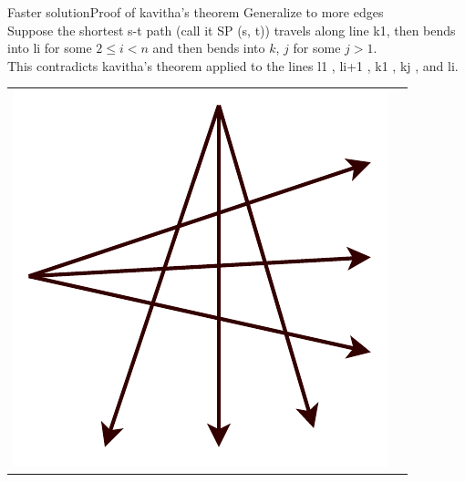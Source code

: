 \documentclass{beamer}
\begin{document}
\begin{frame}{Faster solution}{Proof of kavitha's theorem}
    Generalize to more edges \\
    Suppose the shortest s-t path (call it SP (s, t)) travels along line k1, then bends into li for some $2 \le i < n$ and then bends into $k$, $j$ for some $j > 1$. \\
    This contradicts kavitha's theorem applied to the lines l1 , li+1 , k1 , kj , and li.\\
    \begin{center}
    \begin{tabular}{c c}
        \begin{minipage}{0.4\textwidth}
            \includegraphics[width=\linewidth]{more_edges_1.pdf}
        \end{minipage}  
        &  
        \begin{minipage}{0.4\textwidth}

\end{minipage}
\end{tabular}
\end{center}
\end{frame}
\end{document}
